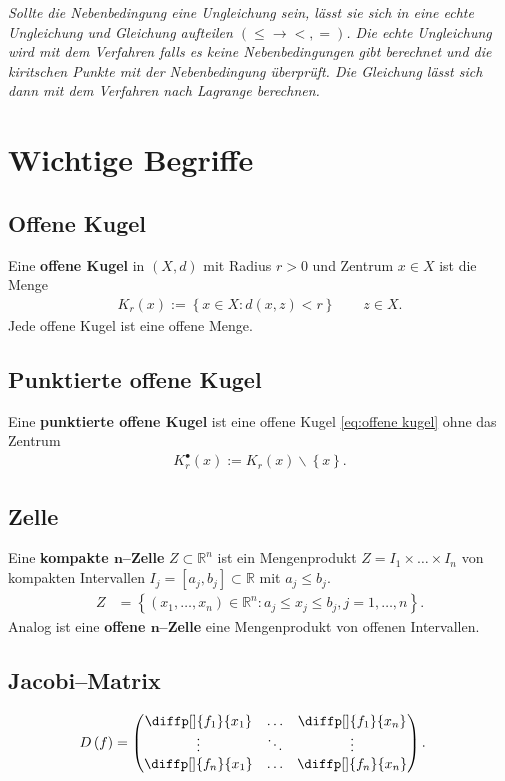 \documentclass[a4paper,12pt]{article}
\numberwithin{equation}{section}
\begin{document}
\textit{Sollte die Nebenbedingung eine Ungleichung sein, lässt sie sich in eine echte Ungleichung und Gleichung aufteilen $\left(\leq \rightarrow <,=\right)$. Die echte Ungleichung wird mit dem Verfahren falls es keine Nebenbedingungen gibt berechnet und die kiritschen Punkte mit der Nebenbedingung überprüft. Die Gleichung lässt sich dann mit dem Verfahren nach Lagrange berechnen.}

\newpage
\section{Wichtige Begriffe}
\subsection{Offene Kugel}
Eine \textbf{offene Kugel} in $\left(X,d\right)$ mit Radius $r>0$ und Zentrum $x \in X$ ist die Menge
\begin{align} 
        K_r\left(x\right):=\left\{x  \in X:d\left(x,z\right)<r\right\}\qquad z \in X\label{eq:offene kugel}
.\end{align} 
Jede offene Kugel ist eine offene Menge.

\subsection{Punktierte offene Kugel}
Eine \textbf{punktierte offene Kugel} ist eine offene Kugel \eqref{eq:offene kugel} ohne das Zentrum
\begin{align} 
        K_r^\bullet \left(x\right):=K_r\left(x\right)\backslash \left\{x\right\}\label{eq:punktierte offene kugel}
.\end{align} 

\subsection{Zelle}
Eine \textbf{kompakte $\boldsymbol{n}$--Zelle} $Z\subset \mathbb{R}^n$ ist ein Mengenprodukt $Z=I_1\times \hdots \times I_n$ von kompakten Intervallen $I_j=\left[a_j,b_j\right]\subset \mathbb{R}$ mit $a_j\leq b_j$. 
\begin{align} 
        Z&=\left\{\left(x_1,\hdots ,x_n\right) \in \mathbb{R}^n:a_j\leq x_j\leq b_j,j=1,\hdots ,n\right\}\label{eq:zelle}
.\end{align} 
Analog ist eine \textbf{offene $\boldsymbol{n}$--Zelle} eine Mengenprodukt von offenen Intervallen.

\subsection{Jacobi--Matrix}
\begin{align} 
        D\left(f\right)&=\begin{pmatrix}
                \diffp[]{f_1}{x_1}&\hdots &\diffp[]{f_1}{x_n}\\
                \vdots &\ddots &\vdots \\
                \diffp[]{f_n}{x_1}&\hdots &\diffp[]{f_n}{x_n}
        \end{pmatrix}\label{eq:jacobi--matrix}
.\end{align} 
\end{document}
